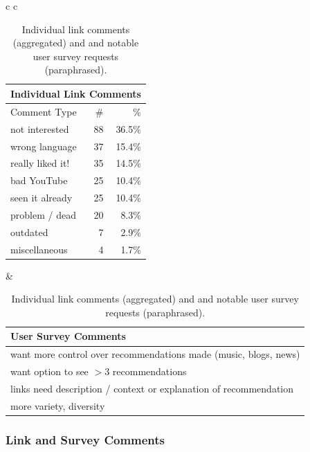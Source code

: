 \begin{table}[t!]
\centering
\footnotesize
\begin{tabular}{c c}
\hspace{-3mm} 
\begin{tabular}{|l|r|r|} 
\multicolumn{3}{c}{Individual Link Comments} \\ \hline
Comment Type & \# & \% \\ \hline %
not interested & 88 & 36.5\% \\
wrong language & 37 & 15.4\% \\
really liked it! & 35 & 14.5\% \\
bad YouTube & 25 & 10.4\% \\
seen it	already & 25 & 10.4\% \\
problem / dead & 20 & 8.3\% \\
outdated & 7 & 2.9\% \\	
miscellaneous & 4 & 1.7\% \\
\hline
\end{tabular}
&
\hspace{-3mm} \begin{tabular}{|p{3.34cm}|}
\multicolumn{1}{p{3.34cm}}{User Survey Comments}\\ \hline
want more control over recommendations made (music, blogs, news)\\ \hline
want option to see $> 3$ recommendations \\ \hline
links need description / context or explanation of recommendation \\ \hline 
more variety, diversity\\ \hline
\end{tabular}
\end{tabular}
\caption{Individual link comments (aggregated) and 
and notable user survey requests (paraphrased).}
\label{table:survey}
\vspace{-3mm}
\end{table}

\subsubsection{Link and Survey Comments}

